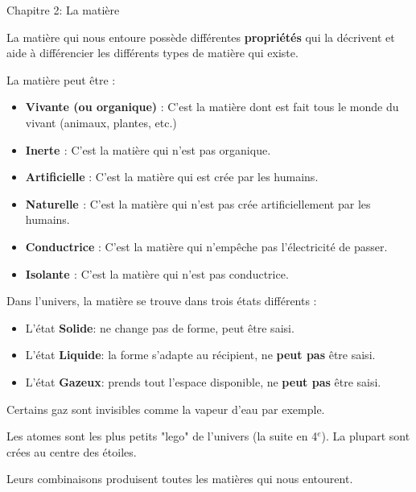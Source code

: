 \documentclass[24pt]{article}
\newcommand{\titre}{Chapitre 2: La matière} %
\begin{document}
\thispagestyle{fancy}
\cfoot{}

\begin{titlebox}{\titre}
    \setlength\parindent{4pt} %
    \setlength\parskip{5pt} 

    La matière qui nous entoure possède différentes \textbf{\color{DarkRed} {propriétés}} 
    qui la décrivent et aide à différencier les différents types de matière qui existe.

    La matière peut être : 
    \begin{itemize}
        \item \textbf{\color{DarkRed} {Vivante (ou organique)}} : 
        C'est la matière dont est fait tous le monde du vivant
        (animaux, plantes, etc.)
        \item \textbf{\color{DarkRed} {Inerte }} :
        C'est la matière qui n'est pas organique.
        \item \textbf{\color{DarkRed} {Artificielle}} : 
        C'est la matière qui est crée par les humains.
        \item \textbf{\color{DarkRed} {Naturelle }} :
        C'est la matière qui n'est pas crée artificiellement par les humains.
        \item \textbf{\color{DarkRed} {Conductrice}} :
        C'est la matière qui n'empêche pas l'électricité de passer.
        \item \textbf{\color{DarkRed} {Isolante }} :
        C'est la matière qui n'est pas conductrice.
    \end{itemize}
    
    \vspace{30pt}

    Dans l'univers, la matière se trouve dans trois états différents :
    \begin{itemize}
        \item L'état \textbf{\color{DarkRed} {Solide}}: ne change pas de forme, peut être saisi.
        \item L'état \textbf{\color{DarkRed} {Liquide}}: la forme s'adapte au récipient, ne \textbf{peut pas} être saisi.
        \item L'état \textbf{\color{DarkRed} {Gazeux}}: prends tout l'espace disponible, ne \textbf{peut pas} être saisi.
    \end{itemize}
    
    Certains gaz sont invisibles comme la vapeur d'eau par exemple.

    \vspace{30pt}
    Les atomes sont les plus petits "lego" de l'univers (la suite en 4$^{e}$).
    La plupart sont crées au centre des étoiles. 
    
    Leurs combinaisons produisent toutes les matières qui nous 
    entourent.

\end{titlebox}
\end{document}
